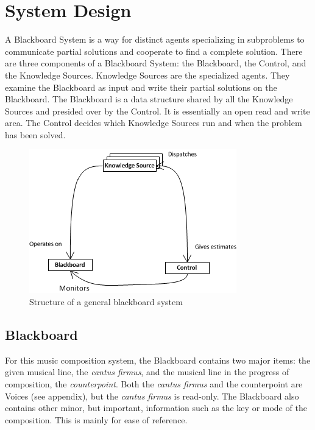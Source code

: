 \section{System Design} %


A Blackboard System is a way for distinct agents specializing in subproblems to communicate partial solutions and cooperate to find a complete solution.
There are three components of a Blackboard System: the Blackboard, the Control, and the Knowledge Sources.
Knowledge Sources are the specialized agents. They examine the Blackboard as input and write their partial solutions on the Blackboard.
The Blackboard is a data structure shared by all the Knowledge Sources and presided over by the Control. It is essentially an open read and write area.
The Control decides which Knowledge Sources run and when the problem has been solved.

\begin{figure}[h]
\centering
	\includegraphics[keepaspectratio=true]{blackboard-system-diagram.png}
\caption{Structure of a general blackboard system}
\end{figure}

\subsection{Blackboard} %

For this music composition system, the Blackboard contains two major items: the given musical line, the \emph{cantus firmus}, and the musical line in the progress of composition, the \emph{counterpoint}.
Both the \emph{cantus firmus} and the counterpoint are Voices (see appendix), but the \emph{cantus firmus} is read-only.
The Blackboard also contains other minor, but important, information such as the key or mode of the composition. This is mainly for ease of reference.

